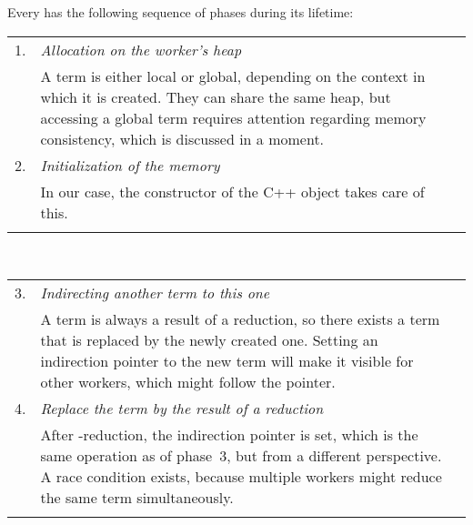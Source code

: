 Every \lterm* has the following sequence of phases during its lifetime: \vspace{1em}\\
\noindent\begin{tabular}{P}
1.  & \emph{Allocation on the worker's heap} &  \\
	& A term is either local or global, depending on the context in which it is created.
	  They can share the same heap, but accessing a global term requires attention regarding memory consistency, which is discussed in a moment. & \\
2.  & \emph{Initialization of the memory} &   \\
	& In our case, the constructor of the C++ object takes care of this. & \\
	& &  \\
\end{tabular}%
\vspace{-1em}\vspace{-3pt}\\%
\begin{tabular}[t]{P}
3.  & \emph{Indirecting another term to this one} &  \\
	& A term is always a result of a reduction, so there exists a term that is replaced by the newly created one.
	  Setting an indirection pointer to the new term will make it visible for other workers, which might follow the pointer. & \\
4.  & \emph{Replace the term by the result of a reduction} &  \\
	& After \fxbeta-reduction, the indirection pointer is set, which is the same operation as of phase~3, but from a different perspective.
	  A race condition exists, because multiple workers might reduce the same term simultaneously. & \\ 
	& &  \\
\end{tabular}%
\vspace{-1em}\vspace{-3pt}\\%
